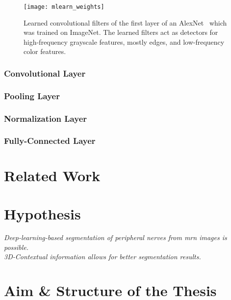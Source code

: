 \begin{figure}[htbp]
    \centering
	\texttt{[image: mlearn\_weights]}
    \caption[Learned Weights of trained AlexNet]{Learned convolutional filters of the first layer of an AlexNet~\cite{Krizhevsky2012ImageNetNetworks} which was trained on ImageNet. The learned filters act as detectors for high-frequency grayscale features, mostly edges, and low-frequency color features.}
    \label{fig:mlearn_weights}
\end{figure}

\subsubsection{Convolutional Layer}
\subsubsection{Pooling Layer}
\subsubsection{Normalization Layer}
\subsubsection{Fully-Connected Layer}



\section{Related Work}
\section{Hypothesis}

\textit{Deep-learning-based segmentation of peripheral nerves from \gls{mrn} images is possible.} \\
\textit{3D-Contextual information allows for better segmentation results.}

\section{Aim \& Structure of the Thesis}

\endinput